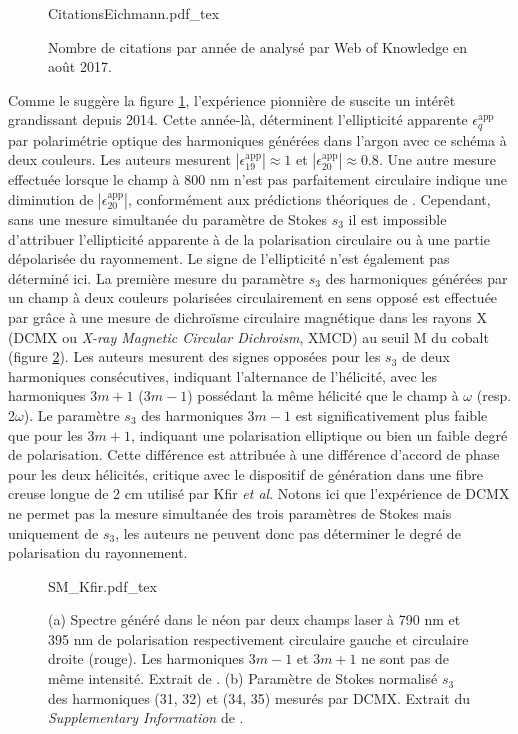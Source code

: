 \begin{figure}[ht]
\centering
\def\svgwidth{0.5\textwidth}
{CitationsEichmann.pdf_tex}
\caption{Nombre de citations par année de  analysé par Web of Knowledge en août 2017.}
\label{fig:CitationsEichmann}
\end{figure}

Comme le suggère la figure \ref{fig:CitationsEichmann}, l'expérience pionnière de  suscite un intérêt grandissant depuis 2014. Cette année-là,  déterminent l'ellipticité apparente $\epsilon_{q}^{\text{app}}$ par polarimétrie optique des harmoniques générées dans l'argon avec ce schéma à deux couleurs. Les auteurs mesurent $|\epsilon_{19}^{\text{app}}| \approx 1 $ et $|\epsilon_{20}^{\text{app}}| \approx 0.8$. Une autre mesure effectuée lorsque le champ à 800 nm n'est pas parfaitement circulaire indique une diminution de $|\epsilon_{20}^{\text{app}}|$, conformément aux prédictions théoriques de . Cependant, sans une mesure simultanée du paramètre de Stokes $s_3$ il est impossible d'attribuer l'ellipticité apparente à de la polarisation circulaire ou à une partie dépolarisée du rayonnement. Le signe de l'ellipticité n'est également pas déterminé ici. La première mesure du paramètre $s_3$ des harmoniques générées par un champ à deux couleurs polarisées circulairement en sens opposé est effectuée par  grâce à une mesure de dichroïsme circulaire magnétique dans les rayons X (DCMX ou \textit{X-ray Magnetic Circular Dichroism}, XMCD) au seuil M du cobalt (figure \ref{fig:SM_Kfir}). Les auteurs mesurent des signes opposées pour les $s_3$ de deux harmoniques consécutives, indiquant l'alternance de l'hélicité, avec les harmoniques $3m+1$ ($3m-1$) possédant la même hélicité que le champ à $\omega$ (resp. 2$\omega$). Le paramètre $s_3$ des harmoniques $3m-1$ est significativement plus faible que pour les $3m+1$, indiquant une polarisation elliptique ou bien un faible degré de polarisation. Cette différence est attribuée à une différence d'accord de phase pour les deux hélicités, critique avec le dispositif de génération dans une fibre creuse longue de 2 cm utilisé par Kfir \textit{et al}. Notons ici que l'expérience de DCMX ne permet pas la mesure simultanée des trois paramètres de Stokes mais uniquement de $s_3$, les auteurs ne peuvent donc pas déterminer le degré de polarisation du rayonnement.

\begin{figure}
\centering
\def\svgwidth{\textwidth}
{SM_Kfir.pdf_tex}
\caption{(a) Spectre généré dans le néon par deux champs laser à 790 nm et 395 nm de polarisation respectivement circulaire gauche et circulaire droite (rouge). Les harmoniques $3m-1$ et $3m+1$ ne sont pas de même intensité. Extrait de . (b) Paramètre de Stokes normalisé $s_3$ des harmoniques (31, 32) et (34, 35)  mesurés par DCMX. Extrait du \textit{Supplementary Information} de .}
\label{fig:SM_Kfir}
\end{figure}

